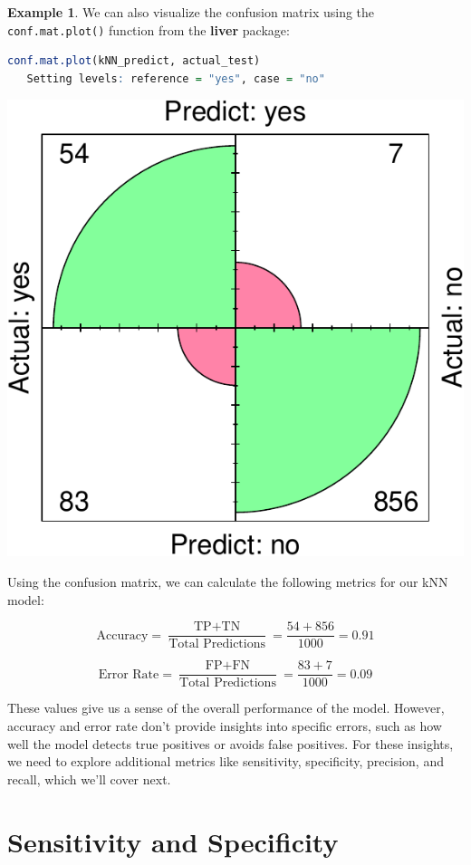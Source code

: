 \documentclass[
]{book}
\newcommand{\passthrough}[1]{#1}
\theoremstyle{definition}
\theoremstyle{definition}
\newtheorem{example}{Example}[chapter]
\theoremstyle{definition}
\theoremstyle{definition}
\theoremstyle{remark}
\begin{document}
\begin{example}
We can also visualize the confusion matrix using the \passthrough{\lstinline!conf.mat.plot()!} function from the \textbf{liver} package:

\begin{lstlisting}[language=R]
conf.mat.plot(kNN_predict, actual_test)
   Setting levels: reference = "yes", case = "no"
\end{lstlisting}

\begin{center}\includegraphics[width=0.65\linewidth]{evaluation_files/figure-latex/unnamed-chunk-5-1} \end{center}

Using the confusion matrix, we can calculate the following metrics for our kNN model:

\[
\text{Accuracy} = \frac{\text{TP} + \text{TN}}{\text{Total Predictions}} = \frac{54 + 856}{1000} = 0.91
\]

\[
\text{Error Rate} = \frac{\text{FP} + \text{FN}}{\text{Total Predictions}} = \frac{83 + 7}{1000} = 0.09
\]

These values give us a sense of the overall performance of the model. However, accuracy and error rate don't provide insights into specific errors, such as how well the model detects true positives or avoids false positives. For these insights, we need to explore additional metrics like sensitivity, specificity, precision, and recall, which we'll cover next.
\end{example}

\section{Sensitivity and Specificity}\label{sensitivity-and-specificity}
\end{document}
